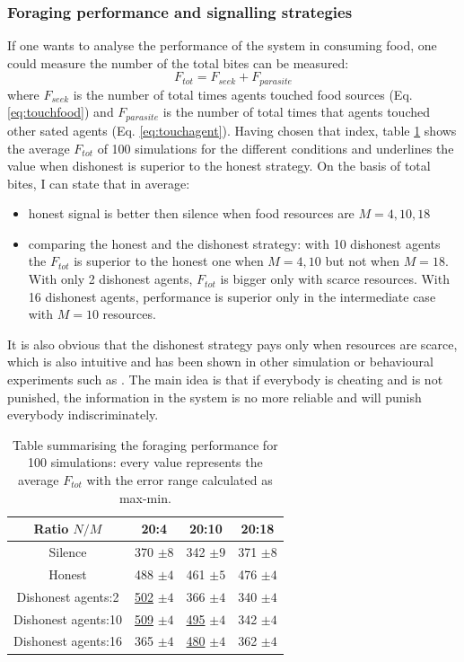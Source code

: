 \subsubsection{Foraging performance and signalling strategies}
If one wants to analyse the performance of the system in consuming food,
one could measure the number of the total bites can be measured:
\begin{equation}
 F_{tot}=F_{seek}+F_{parasite} \label{social:totbites}
\end{equation}
where $F_{seek}$ is the number of total times agents touched food sources (Eq. \ref{eq:touchfood})
and $F_{parasite}$ is the number of total times that agents touched other sated agents (Eq. \ref{eq:touchagent}).
Having chosen that index, table \ref{tab:totalPerformance} shows the average $F_{tot}$ 
of 100 simulations for the different conditions and underlines the value when dishonest is superior to 
the honest strategy.
On the basis of total bites, I can state that in average:
\begin{itemize}
\item honest signal is better then silence when food resources are $M=4,10,18$
\item comparing the honest and the dishonest strategy:
with 10 dishonest agents the $F_{tot}$ is superior to the honest one when $M=4,10$
but not when $M=18$. With only 2 dishonest agents, $F_{tot}$ is bigger only with scarce resources.
With 16 dishonest agents, performance is superior only in the intermediate case with $M=10$ resources.
\end{itemize}
It is also obvious that the dishonest strategy pays only when resources are scarce, 
which is also intuitive and has been shown in other simulation or
behavioural experiments such as \citet{Brembs1996:CheatingPrisonerDilemma,Schwieren2010:CompetitionCheating}.
The main idea is that if everybody is cheating and is not punished, the information
in the system is no more reliable and will punish everybody indiscriminately.

\begin{table}[htbp]
\caption[Social System foraging performance]{
Table summarising the foraging performance for 100 simulations: 
every value represents the average $F_{tot}$ with the error range
calculated as max-min. \label{tab:totalPerformance}}
\begin{center}
\small{
\begin{tabular}{@{}c|ccc@{}}
\hline
Ratio $N/M$ & 20:4 & 20:10 & 20:18\\
\hline
Silence & 370 $\pm 8$& 342 $\pm 9 $& 371 $\pm 8$\\
\hline
Honest & 488 $\pm 4 $& 461 $\pm 5$& 476 $\pm 4$\\
\hline
Dishonest agents:2 & \underline{502} $\pm4 $& 366 $\pm 4$& 340 $\pm 4$\\
Dishonest agents:10 & \underline{509} $\pm 4$ & \underline{495} $\pm 4$ & 342  $\pm 4$\\
Dishonest agents:16 & 365 $\pm 4$& \underline{480} $\pm 4$& 362 $\pm 4$\\
\end{tabular}
}
\end{center}
\end{table}

